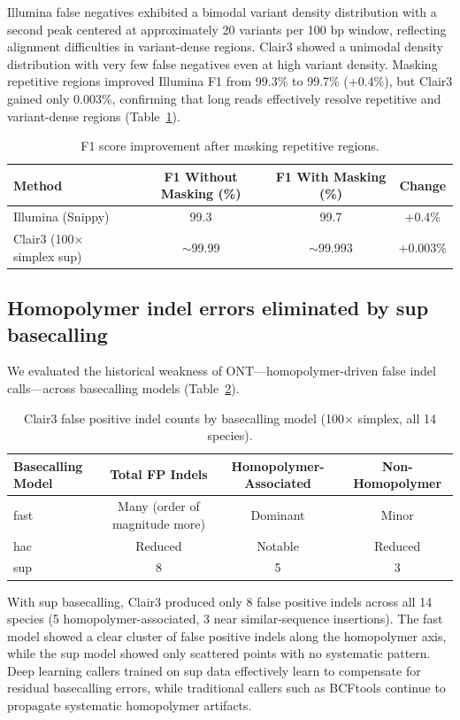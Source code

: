 \documentclass[11pt]{article}
\begin{document}
Illumina false negatives exhibited a bimodal variant density distribution with a second peak centered at approximately 20 variants per 100 bp window, reflecting alignment difficulties in variant-dense regions. Clair3 showed a unimodal density distribution with very few false negatives even at high variant density. Masking repetitive regions improved Illumina F1 from 99.3\% to 99.7\% (+0.4\%), but Clair3 gained only 0.003\%, confirming that long reads effectively resolve repetitive and variant-dense regions (Table~\ref{tab:masking}).

\begin{table}[ht]
\centering
\caption{F1 score improvement after masking repetitive regions.}
\label{tab:masking}
\begin{tabular}{lccc}
\toprule
Method & F1 Without Masking (\%) & F1 With Masking (\%) & Change \\
\midrule
Illumina (Snippy) & 99.3 & 99.7 & +0.4\% \\
Clair3 (100$\times$ simplex sup) & $\sim$99.99 & $\sim$99.993 & +0.003\% \\
\bottomrule
\end{tabular}
\end{table}

\subsection{Homopolymer indel errors eliminated by sup basecalling}

We evaluated the historical weakness of ONT---homopolymer-driven false indel calls---across basecalling models (Table~\ref{tab:homopolymer}).

\begin{table}[ht]
\centering
\caption{Clair3 false positive indel counts by basecalling model (100$\times$ simplex, all 14 species).}
\label{tab:homopolymer}
\begin{tabular}{lccc}
\toprule
Basecalling Model & Total FP Indels & Homopolymer-Associated & Non-Homopolymer \\
\midrule
fast & Many (order of magnitude more) & Dominant & Minor \\
hac & Reduced & Notable & Reduced \\
sup & 8 & 5 & 3 \\
\bottomrule
\end{tabular}
\end{table}

With sup basecalling, Clair3 produced only 8 false positive indels across all 14 species (5 homopolymer-associated, 3 near similar-sequence insertions). The fast model showed a clear cluster of false positive indels along the homopolymer axis, while the sup model showed only scattered points with no systematic pattern. Deep learning callers trained on sup data effectively learn to compensate for residual basecalling errors, while traditional callers such as BCFtools continue to propagate systematic homopolymer artifacts.
\end{document}
